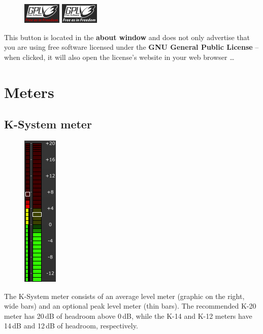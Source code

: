 \begin{figure}
  \includegraphics[scale=\screenshotscale,clip]{include/images/button_gpl_on.png}
  \newline \vspace{-0.9\baselineskip}
  \includegraphics[scale=\screenshotscale,clip]{include/images/button_gpl_off.png}
\end{figure}

This button is located in the \textbf{about window} and does not only
advertise that you are using free software licensed under the
\textbf{GNU General Public License} -- when clicked, it will also open
the license's website in your web browser \dots

\chapter{Meters}

\section{K-System meter}

\begin{figure}
  \includegraphics[scale=\screenshotscale,clip]{include/images/level_meter_combined.png}
\end{figure}

The K-System meter consists of an average level meter (graphic on the
right, wide bars) and an optional peak level meter (thin bars).  The
recommended K-20 meter has 20\,dB of headroom above 0\,dB, while the
K-14 and K-12 meters have 14\,dB and 12\,dB of headroom, respectively.

